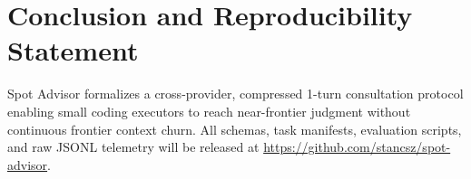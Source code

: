 \documentclass[11pt]{article}
\begin{document}
\section{Conclusion and Reproducibility Statement}
\label{sec:conclusion}

Spot Advisor formalizes a cross-provider, compressed 1-turn consultation protocol enabling small coding executors to reach near-frontier judgment without continuous frontier context churn. All schemas, task manifests, evaluation scripts, and raw JSONL telemetry will be released at \url{https://github.com/stancsz/spot-advisor}.



\end{document}
